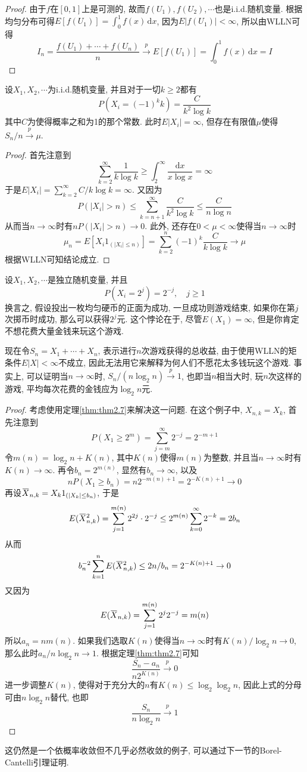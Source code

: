 \documentclass[cn, 12pt, math=mtpro2, bibstyle=apa, blue, twocol]{elegantbook}
\newcommand{\overbar}[1]{\mkern 1.5mu\overline{\mkern-1.5mu#1\mkern-1.5mu}\mkern 1.5mu}
\begin{document}
\begin{proof}
  由于$f$在$[0,1]$上是可测的, 故而$f(U_1),f(U_2),\cdots$也是i.i.d.随机变量. 根据均匀分布可得$E[f(U_1)]=\int_{0}^{1}f(x)\,\text{d}x$, 因为$E|f(U_1)|<\infty$, 所以由WLLN可得
  $$I_n=\frac{f(U_1)+\cdots+f(U_n)}{n}\xrightarrow{p} E[f(U_1)]=\int_{0}^{1}f(x)\,\text{d}x=I$$
\end{proof}
\begin{example}
设$X_1,X_2,\cdots$为i.i.d.随机变量, 并且对于一切$k\ge2$都有
$$P(X_i=(-1)^kk)=\frac{C}{k^2\log k}$$
其中$C$为使得概率之和为1的那个常数. 此时$E|X_i|=\infty$, 但存在有限值$\mu$使得$S_n/n\xrightarrow{p}\mu$.
\end{example}
\begin{proof}
  首先注意到
  $$\sum_{k=2}^{\infty}\frac{1}{k\log k}\geq \int_{2}^{\infty}\frac{\text{d}x}{x\log x}=\infty$$
  于是$E|X_i|=\sum_{k=2}^{\infty}C/k\log k=\infty$. 又因为
  $$P(|X_i|>n)\leq\sum_{k=n+1}^{\infty}\frac{C}{k^2\log k}\leq \frac{C}{n\log n}$$
  从而当$n\to\infty$时有$nP(|X_i|>n)\to0$. 此外, 还存在$0<\mu<\infty$使得当$n\to\infty$时
  $$\mu_n=E[X_i1_{(|X_i|\leq n)}]=\sum_{k=2}^{n}(-1)^k\frac{C}{k\log k}\to \mu$$
  根据WLLN可知结论成立.
\end{proof}

\begin{example}[圣彼得堡悖论]
设$X_1,X_2,\cdots$是独立随机变量, 并且
$$P(X_i=2^j)=2^{-j}, \quad j\ge1$$
换言之, 假设投出一枚均匀硬币的正面为成功, 一旦成功则游戏结束, 如果你在第$j$次掷币时成功, 那么可以获得$2^j$元. 这个悖论在于, 尽管$E(X_1)=\infty$, 但是你肯定不想花费大量金钱来玩这个游戏.

现在令$S_n=X_1+\cdots+X_n$, 表示进行$n$次游戏获得的总收益, 由于使用WLLN的矩条件$E|X|<\infty$不成立, 因此无法用它来解释为何人们不愿花太多钱玩这个游戏. 事实上, 可以证明当$n\to\infty$时, $S_n/ (n\log_2n)\xrightarrow{p}1$, 也即当$n$相当大时, 玩$n$次这样的游戏, 平均每次花费的金钱应为$\log_2n$元.
\end{example}
\begin{proof}
  考虑使用定理\ref{thm:thm2.7}来解决这一问题. 在这个例子中, $X_{n,k}=X_k$, 首先注意到
  $$P(X_1\geq 2^m)=\sum_{j=m}^{\infty}2^{-j}=2^{-m+1}$$
  令$m(n)=\log_2n+K(n)$, 其中$K(n)$使得$m(n)$为整数, 并且当$n\to\infty$时有$K(n)\to \infty$. 再令$b_n=2^{m(n)}$, 显然有$b_n\to\infty$, 以及
  $$nP(X_1\geq b_n)=n2^{-m(n)+1}=2^{-K(n)+1}\to 0$$
  再设$\overbar{X}_{n,k}=X_k1_{(|X_k|\leq b_n)}$, 于是
  $$E(\overbar{X}_{n,k}^2)=\sum_{j=1}^{m(n)}2^{2j}\cdot 2^{-j}\leq 2^{m(n)}\sum_{k=0}^{\infty}2^{-k}=2b_n$$
  从而
  $$b_n^{-2}\sum_{k=1}^{n}E(\overbar{X}_{n,k}^2)\leq 2n/b_n=2^{-K(n)+1}\to 0$$
  又因为
  $$E(\overbar{X}_{n,k})=\sum_{j=1}^{m(n)}2^j2^{-j}=m(n)$$
  所以$a_n=nm(n)$. 如果我们选取$K(n)$使得当$n\to\infty$时有$K(n)/\log_2n\to 0$, 那么此时$a_n/n\log_2n\to1$. 根据定理\ref{thm:thm2.7}可知
  $$\frac{S_n-a_n}{n2^{K(n)}}\xrightarrow{p} 0$$
  进一步调整$K(n)$, 使得对于充分大的$n$有$K(n)\leq \log_2\log_2n$, 因此上式的分母可由$n\log_2n$替代, 也即
  $$\frac{S_n}{n\log_2n}\xrightarrow{p}1$$
\end{proof}
\begin{remark}
这仍然是一个依概率收敛但不几乎必然收敛的例子, 可以通过下一节的Borel-Cantelli引理证明.
\end{remark}
\end{document}
